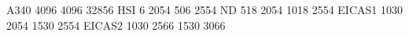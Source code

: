 A340 4096 4096 32856
HSI       6 2054  506 2554
ND      518 2054 1018 2554
EICAS1 1030 2054 1530 2554
EICAS2 1030 2566 1530 3066
